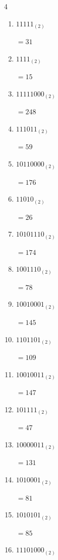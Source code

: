 \begin{multicols}{4}
\begin{enumerate}
        $=117$

  \item $11111_{(2)}$

        $=31$

  \item $1111_{(2)}$

        $=15$

  \item $11111000_{(2)}$

        $=248$

  \item $111011_{(2)}$

        $=59$

  \item $10110000_{(2)}$

        $=176$

  \item $11010_{(2)}$

        $=26$

  \item $10101110_{(2)}$

        $=174$

  \item $1001110_{(2)}$

        $=78$

  \item $10010001_{(2)}$

        $=145$

  \item $1101101_{(2)}$

        $=109$

  \item $10010011_{(2)}$

        $=147$

  \item $101111_{(2)}$

        $=47$

\columnbreak %

  \item $10000011_{(2)}$

        $=131$

  \item $1010001_{(2)}$

        $=81$

  \item $1010101_{(2)}$

        $=85$

  \item $11101000_{(2)}$


\end{enumerate}
\end{multicols}
